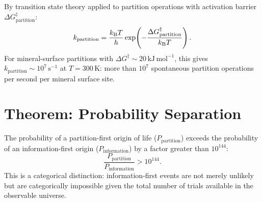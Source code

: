 \begin{corollary}
\label{cor:partition_rate}
By transition state theory applied to partition operations with activation
barrier $\Delta G^{\ddagger}_{\mathrm{partition}}$:
\begin{equation}
  k_{\mathrm{partition}} = \frac{k_{\mathrm{B}} T}{h} \exp\!\left(-\frac{\Delta G^{\ddagger}_{\mathrm{partition}}}{k_{\mathrm{B}} T}\right).
  \label{eq:partition_rate}
\end{equation}
For mineral-surface partitions with $\Delta G^{\ddagger} \sim 20\,\mathrm{kJ\,mol}^{-1}$,
this gives $k_{\mathrm{partition}} \sim 10^7\,\mathrm{s}^{-1}$ at $T = 300\,\mathrm{K}$:
more than $10^7$ spontaneous partition operations per second per mineral surface site.
\end{corollary}

\section{Theorem: Probability Separation}
\label{sec:probability_separation}

\begin{theorem}
\label{thm:probability_separation}
The probability of a partition-first origin of life ($P_{\mathrm{partition}}$)
exceeds the probability of an information-first origin ($P_{\mathrm{information}}$)
by a factor greater than $10^{144}$:
\begin{equation}
  \frac{P_{\mathrm{partition}}}{P_{\mathrm{information}}} > 10^{144}.
  \label{eq:probability_ratio}
\end{equation}
This is a categorical distinction: information-first events are not merely
unlikely but are categorically impossible given the total number of trials
available in the observable universe.
\end{theorem}

